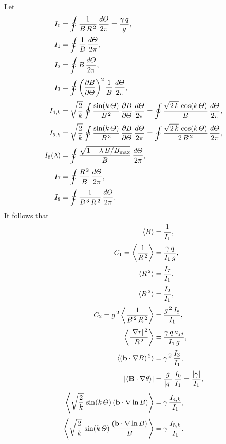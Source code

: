 \documentclass[12pt]{article}
\begin{document}
Let
\begin{align}
I_0 &= \oint \frac{1}{B\,R^{\,2}}\,\frac{d{\mit\Theta}}{2\pi}=\frac{\gamma\,q}{g},\\[0.5ex]
I_1 &=\oint \frac{1}{B}\,\frac{d{\mit\Theta}}{2\pi},\\[0.5ex]
I_2 &=\oint B\,\frac{d{\mit\Theta}}{2\pi},\\[0.5ex]
I_3 &=\oint\left(\frac{\partial B}{\partial{\mit\Theta}}\right)^2\frac{1}{B}\,\frac{d{\mit\Theta}}{2\pi},\\[0.5ex]
I_{4,k}&= \sqrt{\frac{2}{k}}\oint \frac{\sin(k\,{\mit\Theta})}{B^{\,2}}\,\frac{\partial B}{\partial{\mit\Theta}}\,\frac{d{\mit\Theta}}{2\pi}=\oint\frac{\sqrt{2\,k}\,\cos(k\,{\mit\Theta})}{B}\,\frac{d{\mit\Theta}}{2\pi},\\[0.5ex]
I_{5,k} &= \sqrt{\frac{2}{k}}\oint \frac{\sin(k\,{\mit\Theta})}{B^{\,3}}\,\frac{\partial B}{\partial{\mit\Theta}}\,\frac{d{\mit\Theta}}{2\pi}=\oint\frac{\sqrt{2\,k}\,\cos(k\,{\mit\Theta})}{2\,B^{\,2}}\,\frac{d{\mit\Theta}}{2\pi},\\[0.5ex]
I_6(\lambda) &=\oint \frac{\sqrt{1-\lambda\,B/B_{\rm max}}}{B}\,\frac{d{\mit\Theta}}{2\pi},\\[0.5ex]
I_7 &= \oint\frac{R^{\,2}}{B}\,\frac{d{\mit\Theta}}{2\pi},\\[0.5ex]
I_8 &= \oint \frac{1}{B^{\,3}\,R^{\,2}}\,\frac{d{\mit\Theta}}{2\pi}.
\end{align}
It follows that
\begin{align}
\langle B\rangle &= \frac{1}{I_1},\\[0.5ex]
C_1=\left\langle \frac{1}{R^{\,2}}\right\rangle&= \frac{\gamma\,q}{I_1\,g},\\[0.5ex]\langle R^{\,2}\rangle &= \frac{I_7}{I_1},\\[0.5ex]
\langle B^{\,2}\rangle &= \frac{I_2}{I_1},\\[0.5ex]
C_2 = g^{\,2}\left\langle \frac{1}{B^{\,2}\,R^{\,2}}\right\rangle&= \frac {g^{\,2}\,I_8}{I_1},\\[0.5ex]
\left\langle \frac{|\nabla r|^{\,2}}{R^{\,2}}\right\rangle &= \frac{\gamma\,q\,a_{jj}}{I_1\,g},\\[0.5ex]
\langle ({\bf b}\cdot\nabla B)^{\,2}\rangle&= \gamma^{\,2}\,\frac{I_3}{I_1},\\[0.5ex]
|\langle {\bf B}\cdot \nabla \theta\rangle|&= \frac{g}{|q|}\,\frac{I_0}{I_1} = \frac{|\gamma|}{I_1},
\\[0.5ex]
\left\langle \sqrt{\frac{2}{k}}\,\sin(k\,{\mit\Theta}) \,({\bf b}\cdot\nabla \ln B)\right\rangle &= \gamma\,\frac{I_{4,k}}{I_1},\\[0.5ex]
\left\langle \sqrt{\frac{2}{k}}\,\sin(k\,{\mit\Theta}) \,\frac{({\bf b}\cdot\nabla \ln B)}{B}\right\rangle &= \gamma\,\frac{I_{5,k}}{I_1}.
\end{align}
\end{document}
